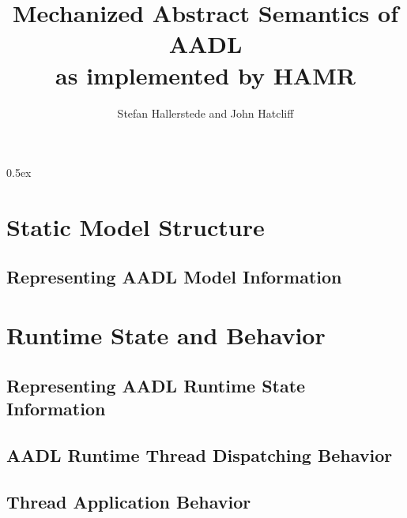 \documentclass[10pt,oneside]{book}
\begin{document}
\title{Mechanized Abstract Semantics of AADL \\  as implemented by HAMR}
\author{Stefan Hallerstede and John Hatcliff}
\maketitle

\tableofcontents

\parindent 0pt\parskip 0.5ex

%

\newpage

% 

\part{Static Model Structure}

\chapter{Representing AADL Model Information}
\label{chap:model}



\part{Runtime State and Behavior}

\chapter{Representing AADL Runtime State Information}







\chapter{AADL Runtime Thread Dispatching Behavior}
\label{chap:dispatch-logic}



\chapter{Thread Application Behavior}
\end{document}

